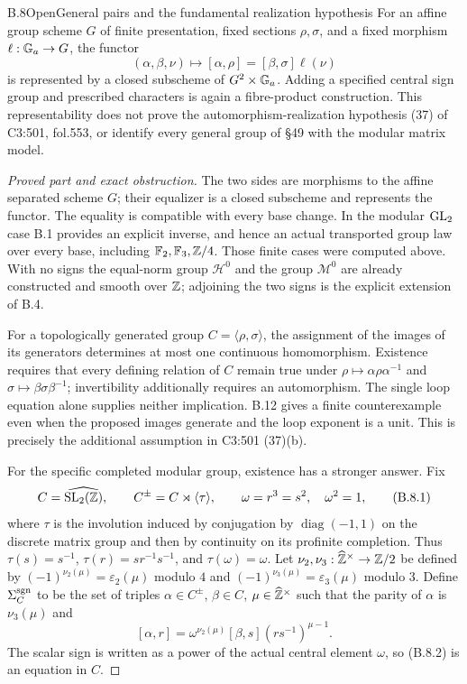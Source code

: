\begin{statement}{B.8}{Open}{General pairs and the fundamental realization hypothesis}
For an affine group scheme $G$ of finite presentation, fixed
sections $\rho,\sigma$, and a fixed morphism
$\ell:\mathbb G_a\to G$, the functor
\[
 (\alpha,\beta,\nu)\longmapsto
 [\alpha,\rho]=[\beta,\sigma]\ell(\nu)
\]
is represented by a closed subscheme of $G^2\times\mathbb G_a$.
Adding a specified central sign group and prescribed
characters is again a fibre-product construction. This
representability does not prove the automorphism-realization
hypothesis (37) of C3:501, fol.553, or identify every general
group of \S49 with the modular matrix model.
\end{statement}
\begin{proof}[Proved part and exact obstruction]
The two sides are morphisms to the affine separated scheme
$G$; their equalizer is a closed subscheme and represents
the functor. The equality is compatible with every base
change. In the modular $\operatorname{GL}_2$ case B.1 provides an explicit
inverse, and hence an actual transported group law over
every base, including $\mathbb F_2,\mathbb F_3,\mathbb Z/4$. Those finite cases
were computed above. With no signs the equal-norm group
$\mathcal H^0$ and the group $\mathcal M^0$ are already
constructed and smooth over $\mathbb Z$; adjoining the two signs
is the explicit extension of B.4.

For a topologically generated group $C=\langle\rho,\sigma\rangle$,
the assignment of the images of its generators determines
at most one continuous homomorphism. Existence requires
that every defining relation of $C$ remain true under
$\rho\mapsto\alpha\rho\alpha^{-1}$ and
$\sigma\mapsto\beta\sigma\beta^{-1}$; invertibility
additionally requires an automorphism. The single loop equation
alone supplies neither implication. B.12 gives a finite counterexample
even when the proposed images generate and the loop exponent is a
unit. This is precisely the additional assumption in C3:501 (37)(b).

For the specific completed modular group, existence has a stronger
answer. Fix
\[
 C=\widehat{\operatorname{SL}_2(\mathbb Z)},\qquad
 C^\pm=C\rtimes\langle\tau\rangle,\qquad
 \omega=r^3=s^2,\quad\omega^2=1,
 \tag{B.8.1}
\]
where $\tau$ is the involution induced by conjugation by
$\operatorname{diag}(-1,1)$ on the discrete matrix group and then
by continuity on its profinite completion. Thus
$\tau(s)=s^{-1}$, $\tau(r)=sr^{-1}s^{-1}$, and $\tau(\omega)=\omega$.
Let $\nu_2,\nu_3:\widehat{\mathbb Z}^\times\to\mathbb Z/2$ be defined by
$(-1)^{\nu_2(\mu)}=\varepsilon_2(\mu)$ modulo $4$ and
$(-1)^{\nu_3(\mu)}=\varepsilon_3(\mu)$ modulo $3$.
Define $\Sigma_C^{\rm sgn}$ to be the set of triples
$\alpha\in C^\pm$, $\beta\in C$, $\mu\in\widehat{\mathbb Z}^\times$
such that the parity of $\alpha$ is $\nu_3(\mu)$ and
\[
 [\alpha,r]=\omega^{\nu_2(\mu)}[\beta,s]
                 (rs^{-1})^{\mu-1}.
 \tag{B.8.2}
\]
The scalar sign is written as a power of the actual central element
$\omega$, so (B.8.2) is an equation in $C$.


\end{proof}
